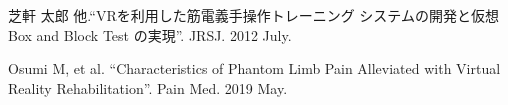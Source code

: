 \documentclass{ltjsarticle}
\begin{document}
\begin{thebibliography}{99}%
	\begin{spacing}{0.8}

	芝軒 太郎 他.``VRを利用した筋電義手操作トレーニング
	システムの開発と仮想 Box and Block Test の実現''. 
	JRSJ. 2012 July.

	Osumi M, et al.
	``Characteristics of Phantom Limb Pain Alleviated 
	with Virtual Reality Rehabilitation''. 
	Pain Med. 2019 May.

	\end{spacing}
\end{thebibliography}
\end{document}
